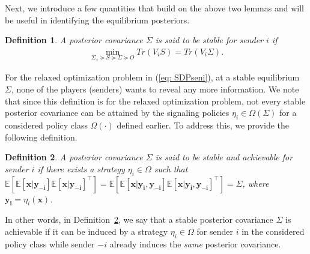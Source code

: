 \documentclass[12pt,journal,onecolumn]{IEEEtran}
\newtheorem{definition}{Definition}
\begin{document}
Next, we introduce a few quantities that build on the above two lemmas and will be useful in identifying the equilibrium posteriors.
\begin{definition}\label{Def_1}
A posterior covariance $\Sigma$ is said to be stable for sender $i$ if 
\begin{align*}
    \min_{\Sigma_x\succeq S\succeq\Sigma\succeq O}Tr(V_iS)=Tr(V_i\Sigma).
\end{align*}
\end{definition}
For the relaxed optimization problem in (\ref{eq: SDPseni}), at a stable equilibrium $\Sigma$, none of the players (senders) wants to reveal any more information. We note that since this definition is for the relaxed optimization problem, not every stable posterior covariance can be attained by the signaling policies $\eta_i \in \Omega(\Sigma)$ for a considered policy class $\Omega(\cdot)$ defined earlier. To address this, we provide the following definition.
\begin{definition}\label{Def_2}
A posterior covariance $\Sigma$ is said to be stable and achievable for sender $i$ if there exists a strategy $\eta_i\in\Omega$ such that $\mathbb{E}[\mathbb{E}[\boldsymbol{x}|\boldsymbol{y_{-i}}]\mathbb{E}[\boldsymbol{x}|\boldsymbol{y_{-i}}]^\top]=\mathbb{E}[\mathbb{E}[\boldsymbol{x}|\boldsymbol{y_i},\boldsymbol{y_{-i}}]\mathbb{E}[\boldsymbol{x}|\boldsymbol{y_i},\boldsymbol{y_{-i}}]^\top]=\Sigma$, where $\boldsymbol{y_i}=\eta_i(\boldsymbol{x})$.
\end{definition}
In other words, in Definition~\ref{Def_2}, we say that a stable posterior covariance $\Sigma$ is achievable if it can be induced by a strategy $\eta_i \in \Omega$ for sender $i$ in the considered policy class while sender $-i$ already induces the \textit{same} posterior covariance.  
\end{document}
